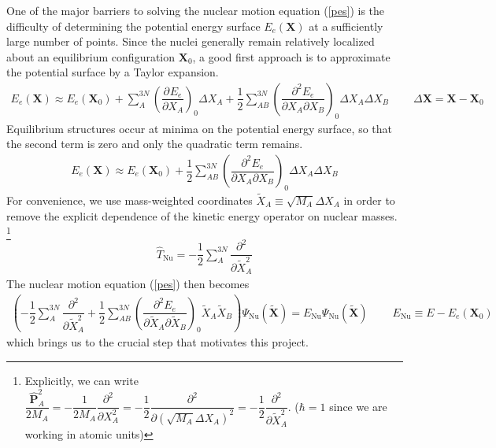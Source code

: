 \documentclass[11pt]{article}
\newcommand{\bo}[1]{\ensuremath{\mathbf{#1}}}
\newcommand{\tl}[1]{\ensuremath{\tilde{#1}}}
\newcommand{\pt}{\partial}
\renewcommand{\sp}{\ \ \ \ \ \ \ \ \ \ }
\newcommand{\fr}[2]{\dfrac{#1}{#2}}
\newcommand{\pr}[1]{\left(#1\right)}
\newcommand{\pd}[3]{\ensuremath{ \dfrac{ \partial^{#1} #2 }{\partial #3 ^{#1}}}}
\newcommand{\Nu}{\ensuremath{\mathrm{Nu}}}
\newcommand{\op}[1]{\ensuremath{\hat{#1}}}
\newcommand{\Y}{\ensuremath{\Psi}}
\newcommand{\D}{\ensuremath{\Delta}}
\begin{document}
One of the major barriers to solving the nuclear motion equation (\ref{pes}) is
the difficulty of determining the potential energy surface $E_e(\bo{X})$ at a
sufficiently large number of points. Since the nuclei generally remain
relatively localized about an equilibrium configuration $\bo{X}_0$, a good
first approach is to approximate the potential surface by a Taylor expansion.
\begin{align*}
    E_e(\bo{X})
\approx
    E_e(\bo{X}_0)
+\sum_A^{3N}
    \pr{\pd{}{E_e}{X_A}}_0
    \D X_A
+\fr{1}{2}\sum_{AB}^{3N}
    \pr{\fr{\pt^2E_e}{\pt X_A\pt X_B}}_0
    \D X_A
    \D X_B
    \sp \D\bo{X}=\bo{X}-\bo{X}_0
\end{align*}
Equilibrium structures occur at minima on the potential energy surface, so that
the second term is zero and only the quadratic term remains.
\begin{align}
    E_e(\bo{X})
\approx
    E_e(\bo{X}_0)
+\fr{1}{2}\sum_{AB}^{3N}
    \pr{\fr{\pt^2E_e}{\pt X_A\pt X_B}}_0
    \D X_A
    \D X_B
\end{align}
For convenience, we use mass-weighted coordinates $\tl{X}_A \equiv \sqrt{M_A}\D
X_A$ in order to remove the explicit dependence of the kinetic energy operator
on nuclear masses. \footnote{Explicitly, we can write
$\fr{\op{\bo{P}}_A^2}{2M_A} = -\fr{1}{2M_A}
\pd{2}{}{X_A}=-\fr{1}{2}\pd{2}{}{(\sqrt{M_A}\D
X_A)}=-\fr{1}{2}\pd{2}{}{\tl{X}_A}$. ($\hbar=1$ since we are working in atomic
units)}
\begin{align}
    \op{T}_\Nu
=
    -\fr{1}{2}\sum_A^{3N} \pd{2}{}{\tl{X}_A}
\end{align}
The nuclear motion equation (\ref{pes}) then becomes
\begin{align}
\label{pes-intermediate}
\pr{
-\fr{1}{2}\sum_A^{3N}
    \pd{2}{}{\tl{X}_A}
+\fr{1}{2}\sum_{AB}^{3N}
    \pr{\fr{\pt^2E_e}{\pt \tl{X}_A\pt \tl{X}_B}}_0
    \tl{X}_A
    \tl{X}_B
}
    \Y_\Nu(\tl{\bo{X}})
=
    E_\Nu
    \Y_\Nu(\tl{\bo{X}})
\sp
    E_\Nu
\equiv
    E - E_e(\bo{X}_0)
\end{align}
which brings us to the crucial step that motivates this project.
\end{document}
